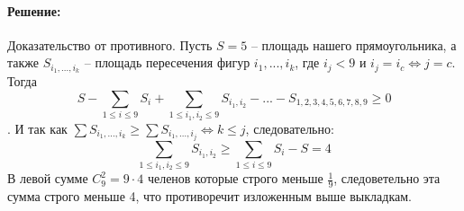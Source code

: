 \documentclass[12pt]{article}
\begin{document}
\paragraph{\bf Решение:}
Доказательство от противного. Пусть $ S = 5 $ -- площадь нашего прямоугольника, а также $ S_{i_1, ..., i_k} $ -- площадь пересечения
фигур $ i_1, ..., i_k $, где $ i_j < 9 \text{ и } i_j = i_c \Leftrightarrow j = c $. Тогда
$$ S - \sum\limits_{1 \le i \le 9} S_i + \sum\limits_{1 \le i_1, i_2 \le 9} S_{i_1, i_2} - ... - S_{1,2,3,4,5,6,7,8,9} \ge 0 $$.
И так как $\sum S_{i_1, ..., i_k} \ge \sum S_{i_1, ..., i_j} \Leftrightarrow k \le j$, следовательно:
$$
\sum\limits_{1 \le i_1, i_2 \le 9} S_{i_1, i_2} \ge \sum\limits_{1 \le i \le 9} S_i - S = 4
$$
В левой сумме $ C_9^2 = 9\cdot4 $ челенов которые строго меньше $ \frac{1}{9} $, 
следоветельно эта сумма строго меньше 4, что противоречит изложенным выше выкладкам.
\end{document}
